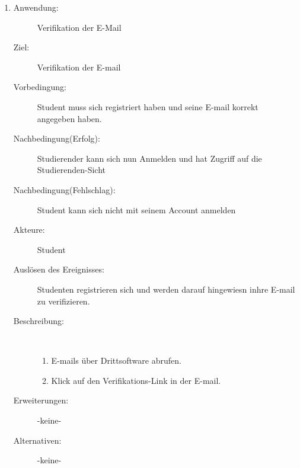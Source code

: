 \documentclass[parskip=full]{scrartcl}
\newcommand{\swtLabel}[1]{\textbf{\textbackslash #1\arabic*0\textbackslash}}
\begin{document}
\begin{enumerate}[label=\swtLabel{S}]
  \item
    \begin{description}
    \item[Anwendung:] Verifikation der E-Mail
    \item[Ziel:] Verifikation der E-mail
    \item[Vorbedingung:] Student muss sich registriert haben und seine E-mail
    korrekt angegeben haben.
    \item[Nachbedingung(Erfolg):] Studierender kann sich nun Anmelden und hat
    Zugriff auf die Studierenden-Sicht
    \item[Nachbedingung(Fehlschlag):] Student kann sich nicht mit seinem Account
    anmelden
    \item[Akteure:] Student
    \item[Auslösen des Ereignisses:] Studenten registrieren sich und werden
    darauf hingewiesn inhre E-mail zu verifizieren.
    \item[Beschreibung:]~
    \begin{enumerate}
      \item E-mails über Drittsoftware abrufen.
      \item Klick auf den Verifikations-Link in der E-mail.      
    \end{enumerate}
    \item[Erweiterungen:] -keine-
    \item[Alternativen:] -keine-
      \end{description}
  

\end{enumerate}
\end{document}
